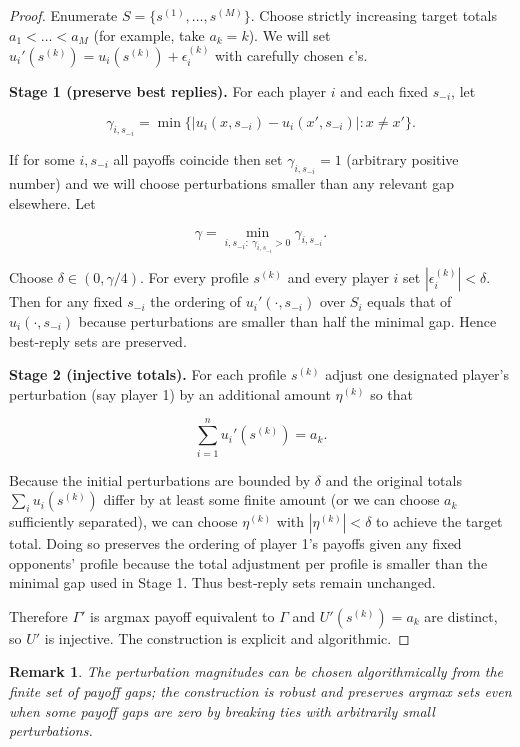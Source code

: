 \documentclass[11pt]{article}
\newtheorem{remark}[theorem]{Remark}
\begin{document}
\begin{proof}
Enumerate \(S=\{s^{(1)},\dots,s^{(M)}\}\). Choose strictly increasing target
totals \(a_1<\dots<a_M\) (for example, take \(a_k=k\)). We will set
\(u_i'(s^{(k)})=u_i(s^{(k)})+\epsilon_i^{(k)}\) with carefully chosen
\(\epsilon\)'s.

\textbf{Stage 1 (preserve best replies).} For each player \(i\) and each
fixed \(s_{-i}\), let


\[
\gamma_{i,s_{-i}}=\min\{|u_i(x,s_{-i})-u_i(x',s_{-i})|: x\ne x'\}.
\]


If for some \(i,s_{-i}\) all payoffs coincide then set \(\gamma_{i,s_{-i}}=1\)
(arbitrary positive number) and we will choose perturbations smaller than
any relevant gap elsewhere. Let


\[
\gamma=\min_{i,s_{-i}:\ \gamma_{i,s_{-i}}>0}\gamma_{i,s_{-i}}.
\]


Choose \(\delta\in(0,\gamma/4)\). For every profile \(s^{(k)}\) and every
player \(i\) set \(|\epsilon_i^{(k)}|<\delta\). Then for any fixed \(s_{-i}\)
the ordering of \(u_i'(\cdot,s_{-i})\) over \(S_i\) equals that of
\(u_i(\cdot,s_{-i})\) because perturbations are smaller than half the minimal
gap. Hence best‑reply sets are preserved.

\textbf{Stage 2 (injective totals).} For each profile \(s^{(k)}\) adjust one
designated player's perturbation (say player 1) by an additional amount
\(\eta^{(k)}\) so that


\[
\sum_{i=1}^n u_i'(s^{(k)}) = a_k.
\]


Because the initial perturbations are bounded by \(\delta\) and the original
totals \(\sum_i u_i(s^{(k)})\) differ by at least some finite amount (or we
can choose \(a_k\) sufficiently separated), we can choose \(\eta^{(k)}\) with
\(|\eta^{(k)}|<\delta\) to achieve the target total. Doing so preserves the
ordering of player 1's payoffs given any fixed opponents' profile because the
total adjustment per profile is smaller than the minimal gap used in Stage 1.
Thus best‑reply sets remain unchanged.

Therefore \(\Gamma'\) is argmax payoff equivalent to \(\Gamma\) and
\(U'(s^{(k)})=a_k\) are distinct, so \(U'\) is injective. The construction is
explicit and algorithmic.
\end{proof}

\begin{remark}
The perturbation magnitudes can be chosen algorithmically from the finite set
of payoff gaps; the construction is robust and preserves argmax sets even
when some payoff gaps are zero by breaking ties with arbitrarily small
perturbations.
\end{remark}
\end{document}
